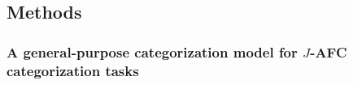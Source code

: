 \documentclass[preprint]{JASA}
\providecommand{\DIFdelbeginFL}{} %
\begin{document}
\subsection{Methods}\label{methods}

\subsubsection{\texorpdfstring{A general-purpose categorization model for \(J\)-AFC categorization tasks}{A general-purpose categorization model for J-AFC categorization tasks}}\label{sec:predict-perception}

\begin{figure}[!ht]
\begin{center}
   \DIFdelbeginFL %


\end{center}
\end{figure}
\end{document}
